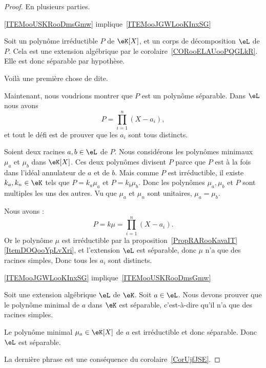 \begin{proof}

    En plusieurs parties.

    \begin{subproof}
        \item[\ref{ITEMooUSKRooDmsGmw} implique~\ref{ITEMooJGWLooKInxSG}]

            Soit un polynôme irréductible \( P\) de \( \eK[X]\), et un corps de décomposition \( \eL\) de \( P\). Cela est une extension algébrique par le corolaire~\ref{CORooELAUooPQGLkR}. Elle est donc séparable par hypothèse.

            Voilà une première chose de dite.

            Maintenant, nous voudrions montrer que \( P\) est un polynôme séparable. Dans \( \eL\) nous avons
            \begin{equation}
                P=\prod_{i=1}^n(X-a_i),
            \end{equation}
            et tout le défi est de prouver que les \( a_i\) sont tous distincts.

            Soient deux racines \( a,b\in \eL\) de \( P\). Nous considérons les polynômes minimaux \( \mu_a\) et \( \mu_b\) dans \( \eK[X]\). Ces deux polynômes divisent \( P\) parce que \( P\) est à la fois dans l'idéal annulateur de \( a\) et de \( b\). Mais comme \( P\) est irréductible, il existe \( k_a,k_n\in \eK\) tels que \( P=k_a\mu_a\) et \( P=k_b\mu_b\). Donc les polynômes \( \mu_a,\mu_b\) et \( P\) sont multiples les uns des autres. Vu que \( \mu_a\) et \( \mu_n\) sont unitaires, \( \mu_a=\mu_b\).

            Nous avons :
            \begin{equation}
                P=k\mu=\prod_{i=1}^n(X-a_i).
            \end{equation}
            Or le polynôme \( \mu\) est irréductible par la proposition~\ref{PropRARooKavaIT}\ref{ItemDOQooYpLvXri}, et l'extension \( \eL\) est séparable, donc \( \mu\) n'a que des racines simples, Donc tous les \( a_i\) sont distincts.

        \item[\ref{ITEMooJGWLooKInxSG} implique~\ref{ITEMooUSKRooDmsGmw}]

            Soit une extension algébrique \( \eL\) de \( \eK\). Soit \( a\in \eL\). Nous devons prouver que le polynôme minimal de \( a\) dans \( \eK\) est séparable, c'est-à-dire qu'il n'a que des racines simples.

            Le polynôme minimal \( \mu_a\in \eK[X]\) de \( a\) est irréductible et donc séparable. Donc \( \eL\) est séparable.

    \end{subproof}

    La dernière phrase est une conséquence du corolaire~\ref{CorUjfJSE}.
\end{proof}

